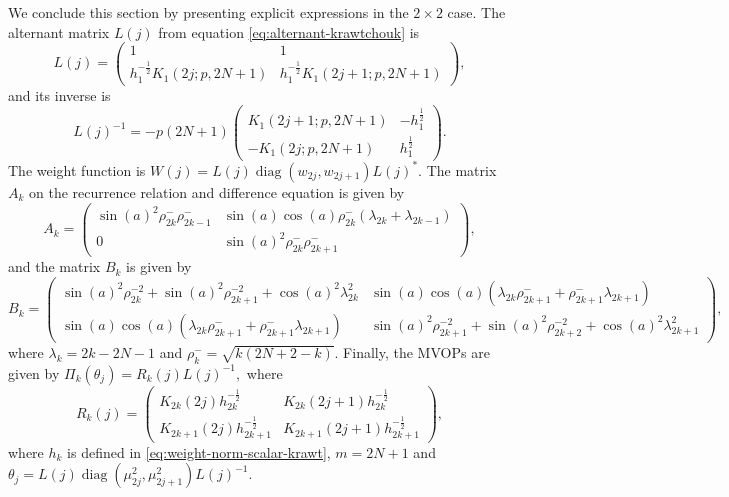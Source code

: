 \documentclass[a4paper,reqno]{amsart}
\DeclareMathOperator{\diag}{diag}
\theoremstyle{definition}
\numberwithin{equation}{section}
\begin{document}
We conclude this section by presenting explicit expressions in the $2\times2$ case. The alternant matrix $L(j)$ from equation \eqref{eq:alternant-krawtchouk} is
\begin{equation}
    L(j)=\begin{pmatrix}
1&1\\
h_{1}^{-\frac{1}{2}}K_1(2j;p,2N+1)&h_{1}^{-\frac{1}{2}}K_1(2j+1;p,2N+1)
\end{pmatrix},
\end{equation}
and its inverse is 
\begin{equation}
    L(j)^{-1}=-p(2N+1)\begin{pmatrix}
K_1(2j+1;p,2N+1)&-h_{1}^{\frac{1}{2}}\\
-K_1(2j;p,2N+1)&h_{1}^{\frac{1}{2}}
\end{pmatrix}.
\end{equation}
The weight function is $W(j)=L(j)\diag(w_{2j},w_{2j+1})L(j)^\ast.$ The matrix $A_k$ on the recurrence relation and difference equation is given by
\begin{equation}
    A_{k}= \begin{pmatrix}
\sin(a)^2\rho^-_{2 k} \rho^-_{2 k-1} & \sin(a)\cos(a)\rho^-_{2 k}(\lambda_{2 k}+\lambda_{2 k -1})  
\\
0 & \sin(a)^2\rho^-_{2 k}\rho^-_{2 k +1}
\end{pmatrix},
\end{equation}
and the matrix $B_k$ is given by
\begin{equation}
    B_k=\begin{pmatrix}
\sin(a)^2 \rho_{2 k}^{-2} +\sin(a)^2 \rho _{2 k+1}^{-2} +\cos(a)^{2} \lambda_{2 k}^{2}& \sin(a)\cos(a)(\lambda_{2 k} \rho_{2 k+1}^- + \rho_{2 k+1}^-\lambda_{2 k +1})
\\
 \sin(a)\cos(a)(\lambda_{2 k} \rho_{2 k+1}^- + \rho_{2 k+1}^-\lambda_{2 k +1}) & \sin(a)^2 \rho_{2 k +1}^{-2}+\sin(a)^2\rho_{2 k+2}^{-2}+\cos(a)^2 \lambda_{2 k +1}^{2}
\end{pmatrix},
\end{equation}
where $
\lambda_k=2k-2N-1$ and $ \rho^-_k=\sqrt{k(2N+2-k)}$.
Finally, the MVOPs are given by $\Pi_k(\theta_j)=R_k(j)L(j)^{-1},$ where 
\begin{equation}
    R_k(j)=\begin{pmatrix}
K_{2k}(2j)h_{2k}^{-\frac{1}{2}}&K_{2k}(2j+1)h_{2k}^{-\frac{1}{2}}\\
K_{2k+1}(2j)h_{2k+1}^{-\frac{1}{2}}&K_{2k+1}(2j+1)h_{2k+1}^{-\frac{1}{2}}
\end{pmatrix},
\end{equation}
where $h_k$ is defined in \eqref{eq:weight-norm-scalar-krawt}, $m=2N+1$ and $\theta_j=L(j)\diag(\mu_{2j}^2,\mu_{2j+1}^2)L(j)^{-1}$.
\end{document}
